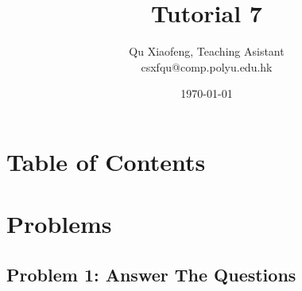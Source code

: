 \documentclass[
        ]{beamer}
\title{Tutorial 7}
\author[COMP435p]{Qu Xiaofeng\texorpdfstring{, Teaching Asistant\\\tiny{csxfqu@comp.polyu.edu.hk}}{}}
\institute{COMP435p\\Biometrics Authentication}
\date{\today}
\begin{document}
\newcommand{\inpdfu}[2]{\begin{figure}\centering\texttt{[image: im/lecture\_\#1]}\end{figure}}
\newcommand{\inpdfl}[2]{\begin{figure}\centering\texttt{[image: im/lecture\_\#1]}\end{figure}}
\newcommand{\inpdfc}[2]{\begin{figure}\centering\texttt{[image: im/lecture\_\#1]}\end{figure}}
\newcommand{\inpng}[1]{\begin{figure}\centering\texttt{[image: im/\#1]}\end{figure}}

\frame{\titlepage}

\section*{Table of Contents}

    \begin{frame}{\secname}
        \tableofcontents
    \end{frame}




\section{Problems}

\subsection{Problem 1: Answer The Questions}
\end{document}
